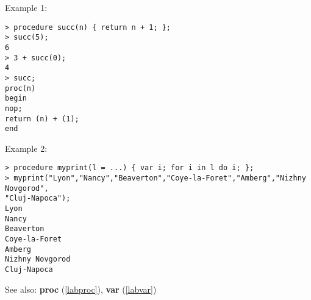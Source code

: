 \noindent Example 1: 
\begin{center}\begin{minipage}{15cm}\begin{Verbatim}[frame=single]
> procedure succ(n) { return n + 1; };
> succ(5);
6
> 3 + succ(0);
4
> succ;
proc(n)
begin
nop;
return (n) + (1);
end
\end{Verbatim}
\end{minipage}\end{center}
\noindent Example 2: 
\begin{center}\begin{minipage}{15cm}\begin{Verbatim}[frame=single]
> procedure myprint(l = ...) { var i; for i in l do i; };
> myprint("Lyon","Nancy","Beaverton","Coye-la-Foret","Amberg","Nizhny Novgorod",
"Cluj-Napoca");
Lyon
Nancy
Beaverton
Coye-la-Foret
Amberg
Nizhny Novgorod
Cluj-Napoca
\end{Verbatim}
\end{minipage}\end{center}
See also: \textbf{proc} (\ref{labproc}), \textbf{var} (\ref{labvar})
